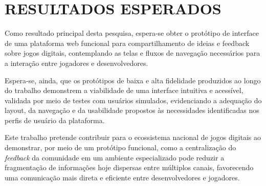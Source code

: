 

\chapter{RESULTADOS ESPERADOS} \label{cha:resultados-esperados}


Como resultado principal desta pesquisa, espera-se obter o protótipo de interface de uma plataforma web funcional para compartilhamento de ideias e feedback sobre jogos digitais, contemplando as telas e fluxos de navegação necessários para a interação entre jogadores e desenvolvedores.

Espera-se, ainda, que os protótipos de baixa e alta fidelidade produzidos ao longo do trabalho demonstrem a viabilidade de uma interface intuitiva e acessível, validada por meio de testes com usuários simulados, evidenciando a adequação do layout, da navegação e da usabilidade propostos às necessidades identificadas nos perfis de usuário da plataforma.

Este trabalho pretende contribuir para o ecossistema nacional de jogos digitais ao demonstrar, por meio de um protótipo funcional, como a centralização do \textit{feedback} da comunidade em um ambiente especializado pode reduzir a fragmentação de informações hoje dispersas entre múltiplos canais, favorecendo uma comunicação mais direta e eficiente entre desenvolvedores e jogadores.